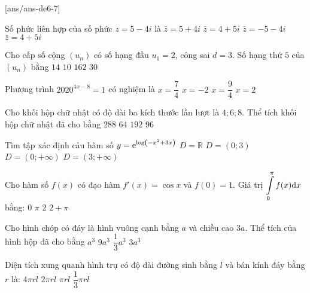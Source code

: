 
\begin{name}
	{\tenchude}
	{\tendethi}
	{\tentruong}
	{\thoigian}
\end{name}
[ans/ans-de6-7]

\begin{ex}%
Số phức liên hợp của số phức $z=5-4 i$ là
\choice
{\True $\bar{z}=5+4 i$}
{$\bar{z}=4+5 i$}
{$\bar{z}=-5-4 i$}
{$\bar{z}=4+5 i$}

\end{ex}
\begin{ex}%
Cho cấp số cộng $\left(u_n\right)$ có số hạng đầu $u_1=2$, công sai $d=3$. Số hạng thứ $5$ của $\left(u_n\right)$ bằng
\choice
{\True $14$}
{$10$}
{$162$}
{$30$}

\end{ex}
\begin{ex}%
Phương trình $2020^{4 x-8}=1$ có nghiệm là
\choice
{$x=\dfrac{7}{4}$}
{$x=-2$}
{$x=\dfrac{9}{4}$}
{\True $x=2$}

\end{ex}
\begin{ex}%
Cho khối hộp chữ nhật có độ dài ba kích thước lần lượt là $4; 6; 8$. Thể tích khối hộp chữ nhật đã cho bằng
\choice
{$288$}
{$64$}
{\True $192$}
{$96$}

\end{ex}
\begin{ex}%
Tìm tập xác định cảu hàm số $y={\rm e}^{\log \left(-x^2+3 x\right)}$ 
\choice
{$D=\mathbb{R}$}
{$D=(0;3)$}
{$D=(0;+\infty)$}
{\True $D=(3;+\infty)$}

\end{ex}
\begin{ex}%
Cho hàm số $f(x)$ có đạo hàm $f'(x)=\cos x$ và $f(0)=1$. Giá trị $\displaystyle\displaystyle\int\limits_0^{\pi} f(x) \mathrm{d} x$ bằng:
\choice
{$0$}
{$\pi$}
{$2$}
{\True $2+\pi$}

\end{ex}
\begin{ex}%
Cho hình chóp có đáy là hình vuông cạnh bằng $a$ và chiều cao $3 a$. Thể tích của hình hộp đã cho bằng
\choice
{$a^3$}
{$9 a^3$}
{$\dfrac{1}{3} a^3$}
{\True $3 a^3$}

\end{ex}
\begin{ex}%
Diện tích xung quanh hình trụ có độ dài đường sinh bằng $l$ và bán kính đáy bằng $r$ là:
\choice
{$4\pi r l$}
{\True $2\pi r l$}
{$\pi r l$}
{$\dfrac{1}{3} \pi r l$}

\end{ex}

